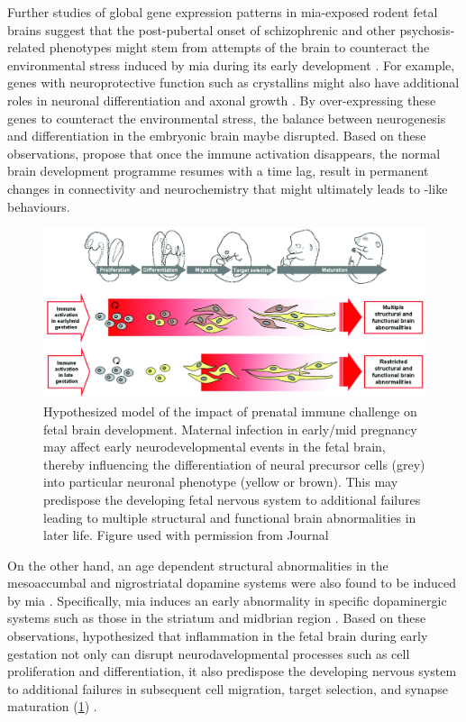 	Further studies of global gene expression patterns in \gls{mia}-exposed rodent fetal brains \citep{Oskvig2012,Garbett2012a} suggest that the post-pubertal onset of schizophrenic and other psychosis-related phenotypes might stem from attempts of the brain to counteract the environmental stress induced by \gls{mia} during its early development \citep{Garbett2012a}.
	For example, genes with neuroprotective function such as crystallins might also have additional roles in neuronal differentiation and axonal growth \citep{Garbett2012a}. 
	By over-expressing these genes to counteract the environmental stress, the balance between neurogenesis and differentiation in the embryonic brain maybe disrupted. 
	Based on these observations, \citet{Garbett2012a} propose that once the immune activation disappears, the normal brain development programme resumes with a time lag, result in permanent changes in connectivity and neurochemistry that might ultimately leads to -like behaviours.
	\begin{figure}
		\centering
		\includegraphics[width=\textwidth]{figure/mia_impact.jpg}
		\caption[Hypothesized model of the impact of prenatal immune challenge on fetal brain development]{Hypothesized model of the impact of prenatal immune challenge on fetal brain development.
			Maternal infection in early/mid pregnancy may affect early neurodevelopmental events in the fetal brain, thereby influencing the differentiation of neural precursor cells (grey) into particular neuronal phenotype (yellow or brown).
			This may predispose the developing fetal nervous system to additional failures leading to multiple structural and functional brain abnormalities in later life.
			Figure used with permission from Journal \citep{Meyer2007a}}
		\label{fig:miaEffect}
	\end{figure}
	
	On the other hand, an age dependent structural abnormalities in the mesoaccumbal and nigrostriatal dopamine systems were also found to be induced by \gls{mia} \citep{Vuillermot2010}.
	Specifically, \gls{mia} induces an early abnormality in specific dopaminergic systems such as those in the striatum and midbrian region \citep{Vuillermot2010}.
	Based on these observations, \citet{Meyer2007a} hypothesized that inflammation in the fetal brain during early gestation not only can disrupt neurodavelopmental processes such as cell proliferation and differentiation, it also predispose the developing nervous system to additional failures in subsequent cell migration, target selection, and synapse maturation (\cref{fig:miaEffect}) \citep{Meyer2007a}.
		
